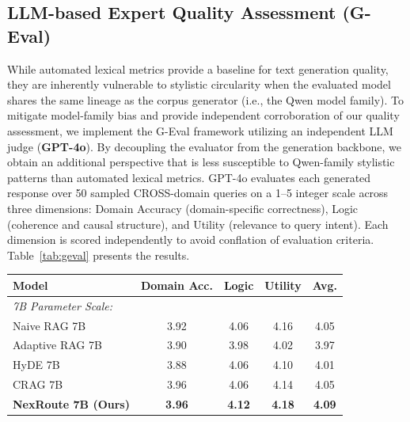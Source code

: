 \documentclass[a4paper,fleql]{cas-sc}
\begin{document}
\subsection{LLM-based Expert Quality Assessment (G-Eval)}
\label{ssec:geval}
While automated lexical metrics provide a baseline for text generation quality, 
they are inherently vulnerable to stylistic circularity when the evaluated model 
shares the same lineage as the corpus generator (i.e., the Qwen model family). 
To mitigate model-family bias and provide independent corroboration of our
quality assessment, we implement the G-Eval framework \citep{liu2023geval}
utilizing an independent LLM judge (\textbf{GPT-4o}). By decoupling the
evaluator from the generation backbone, we obtain an additional perspective
that is less susceptible to Qwen-family stylistic patterns than automated
lexical metrics. GPT-4o evaluates each generated response over
50 sampled CROSS-domain queries on a 1--5 integer scale across three
dimensions: Domain Accuracy (domain-specific correctness), Logic (coherence
and causal structure), and Utility (relevance to query intent). Each dimension
is scored independently to avoid conflation of evaluation criteria.
Table~\ref{tab:geval} presents the results.

\vspace{6pt}
\begin{center}
\begingroup
{}
\label{tab:geval}
\begin{tabular}{lcccc}
\toprule
\textbf{Model} & \textbf{Domain Acc.} & \textbf{Logic} & \textbf{Utility} & \textbf{Avg.} \\
\midrule
\multicolumn{5}{l}{\textit{7B Parameter Scale:}} \\
Naive RAG 7B                & 3.92 & 4.06 & 4.16 & 4.05 \\
Adaptive RAG 7B             & 3.90 & 3.98 & 4.02 & 3.97 \\
HyDE 7B                     & 3.88 & 4.06 & 4.10 & 4.01 \\
CRAG 7B                     & 3.96 & 4.06 & 4.14 & 4.05 \\
\textbf{NexRoute 7B (Ours)} & \textbf{3.96} & \textbf{4.12} & \textbf{4.18} & \textbf{4.09} \\
\bottomrule
\end{tabular}
\endgroup
\end{center}
\vspace{6pt}
\end{document}
